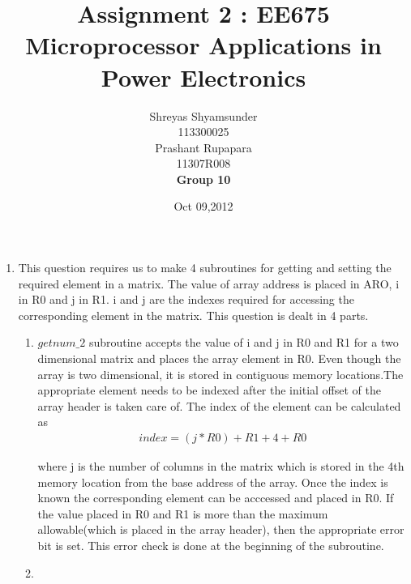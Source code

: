 \documentclass[a4paper,12pt]{article}
\begin{document}
\title{\textbf{Assignment 2 : EE675 Microprocessor Applications in Power Electronics}}
	\author{Shreyas Shyamsunder \\ 113300025 \\
		Prashant Rupapara \\ 11307R008 \\
		\textbf{Group 10} \\}
	\date{Oct 09,2012}
	\maketitle

\maketitle
\begin{enumerate}
 \item
 \begin{flushleft}
  This question requires us to make 4 subroutines for getting and setting the required element in a matrix. The value of array
  address is placed in ARO, i in R0 and j in R1. i and j are the indexes required for accessing the corresponding element in
  the matrix. This question is dealt in 4 parts. 
  \begin{enumerate}
   \item 
   \begin{flushleft}
    $getnum\_2$ subroutine accepts the value of i and j in R0 and R1 for a two dimensional matrix and places the array element in R0. Even though the
    array is two dimensional, it is stored in contiguous memory locations.The appropriate element needs to be indexed after
    the initial offset of the array header is taken care of. The index of the element can be calculated as 
    \begin{align}
     index = (j*R0)+R1+4+R0 \nonumber
    \end{align}
    \begin{flushleft}
    where j is the number of columns in the matrix which is stored in the 4th memory location from the base address of the 
     array. Once the index is known the corresponding element can be acccessed and placed in R0. If the value placed in R0 
     and R1 is more than the maximum allowable(which is placed in the array header), then the appropriate error bit is set.
     This error check is done at the beginning of the subroutine. 
    \end{flushleft}
  \end{flushleft}
  \item

\end{enumerate}
\end{flushleft}
\end{enumerate}
\end{document}

